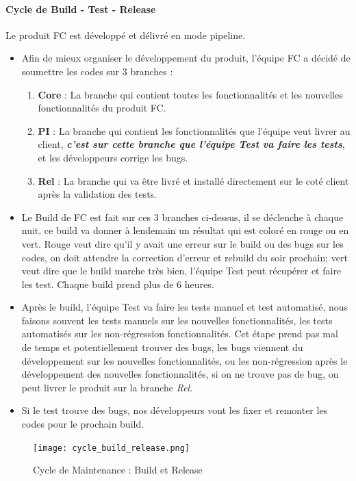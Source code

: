     \paragraph{Cycle de Build - Test - Release}
    \par Le produit FC est développé et délivré en mode pipeline.
    \begin{itemize}[label=\textbullet]
    	\item Afin de mieux organiser le développement du produit, l'équipe FC a décidé de soumettre les codes sur 3 branches : 
    	\begin{enumerate}
    		\item \textbf{Core} : La branche qui contient toutes les fonctionnalités et les nouvelles fonctionnalités du produit FC.
    		\item \textbf{PI} : La branche qui contient les fonctionnalités que l'équipe veut livrer au client, \textbf{\textit{c'est sur cette branche que l'équipe Test va faire les tests}}, et les développeurs corrige les bugs.
    		\item \textbf{Rel} : La branche qui va être livré et installé directement sur le coté client après la validation des tests.
    	\end{enumerate}
        \item Le Build de FC est fait sur ces 3 branches ci-dessus, il se déclenche à chaque nuit, ce build va donner à lendemain un résultat qui est coloré en rouge ou en vert. Rouge veut dire qu'il y avait une erreur sur le build ou des bugs sur les codes, on doit attendre la correction d'erreur et rebuild du soir prochain; vert veut dire que le build marche très bien, l'équipe Test peut récupérer et faire les test. Chaque build prend plus de 6 heures.
        \item Après le build, l'équipe Test va faire les tests manuel et test automatisé, nous faisons souvent les tests manuels sur les nouvelles fonctionnalités, les tests automatisés sur les non-régression fonctionnalités. Cet étape prend pas mal de temps et potentiellement trouver des bugs, les bugs viennent du développement sur les nouvelles fonctionnalités, ou les non-régression après le développement des nouvelles fonctionnalités, si on ne trouve pas de bug, on peut livrer le produit sur la branche \textit{Rel}.
        \item Si le test trouve des bugs, nos développeurs vont les fixer et remonter les codes pour le prochain build. 
    \end{itemize}
    \begin{figure}[H]
        \centering
        \texttt{[image: cycle\_build\_release.png]}
        \caption{Cycle de Maintenance : Build et Release}
        \label{fig:cycle_maintenance_release_build}
    \end{figure}
    

